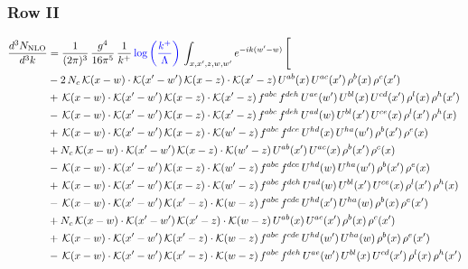 \documentclass[9pt]{article}
\numberwithin{equation}{section}
\begin{document}
\subsubsection{Row II}
\begin{align}
\frac{d^{3}N_{\mathrm{NLO}}}{d^{3}k} & = \frac{1}{(2\pi)^{3}}\,\frac{g^{4}}{16\pi^{5}}\,\frac{1}{k^{+}}\,{\color{blue}\log{\left(\frac{k^{+}}{\Lambda}\right)}}\,\int_{x,x',z,w,w'}e^{-ik(w'-w)}\,\Bigg[\notag\\ &  -2\,N_{c}\,\mathcal{K}(x-w)\cdot\mathcal{K}(x'-w')\,\mathcal{K}(x-z)\cdot\mathcal{K}(x'-z)\,U^{ab}(x)\,U^{ac}(x')\,\rho^{b}(x)\,\rho^{c}(x')\notag\\
& +\,\mathcal{K}(x-w)\cdot\mathcal{K}(x'-w')\,\mathcal{K}(x-z)\cdot\mathcal{K}(x'-z)\,f^{abc}\,f^{deh}\,U^{ae}(w')\,U^{bl}(x)\,U^{cd}(x')\,\rho^{l}(x)\,\rho^{h}(x')\notag\\
& -\,\mathcal{K}(x-w)\cdot\mathcal{K}(x'-w')\,\mathcal{K}(x-z)\cdot\mathcal{K}(x'-z)\,f^{abc}\,f^{deh}\,U^{ad}(w)\,U^{bl}(x')\,U^{ce}(x)\,\rho^{l}(x')\,\rho^{h}(x)\notag\\
& +\,\mathcal{K}(x-w)\cdot\mathcal{K}(x'-w')\,\mathcal{K}(x-z)\cdot\mathcal{K}(w'-z)\,f^{abc}\,f^{dce}\,U^{hd}(x)\,U^{ha}(w')\,\rho^{b}(x')\,\rho^{e}(x)\notag\\
& +N_{c}\,\mathcal{K}(x-w)\cdot\mathcal{K}(x'-w')\,\mathcal{K}(x-z)\cdot\mathcal{K}(w'-z)\,U^{ab}(x')\,U^{ac}(x)\,\rho^{b}(x')\,\rho^{c}(x)\notag\\
& -\,\mathcal{K}(x-w)\cdot\mathcal{K}(x'-w')\,\mathcal{K}(x-z)\cdot\mathcal{K}(w'-z)\,f^{abc}\,f^{dce}\,U^{hd}(w)\,U^{ha}(w')\,\rho^{b}(x')\,\rho^{e}(x)\notag\\
& +\,\mathcal{K}(x-w)\cdot\mathcal{K}(x'-w')\,\mathcal{K}(x-z)\cdot\mathcal{K}(w'-z)\,f^{abc}\,f^{deh}\,U^{ad}(w)\,U^{bl}(x')\,U^{ce}(x)\,\rho^{l}(x')\,\rho^{h}(x)\notag\\
& -\,\mathcal{K}(x-w)\cdot\mathcal{K}(x'-w')\,\mathcal{K}(x'-z)\cdot\mathcal{K}(w-z)\,f^{abc}\,f^{cde}\,U^{hd}(x')\,U^{ha}(w)\,\rho^{b}(x)\,\rho^{e}(x')\notag\\
& +N_{c}\,\mathcal{K}(x-w)\cdot\mathcal{K}(x'-w')\,\mathcal{K}(x'-z)\cdot\mathcal{K}(w-z)\,U^{ab}(x)\,U^{ac}(x')\,\rho^{b}(x)\,\rho^{c}(x')\notag\\
& +\,\mathcal{K}(x-w)\cdot\mathcal{K}(x'-w')\,\mathcal{K}(x'-z)\cdot\mathcal{K}(w-z)\,f^{abc}\,f^{cde}\,U^{hd}(w')\,U^{ha}(w)\,\rho^{b}(x)\,\rho^{e}(x')\notag\\
& -\,\mathcal{K}(x-w)\cdot\mathcal{K}(x'-w')\,\mathcal{K}(x'-z)\cdot\mathcal{K}(w-z)\,f^{abc}\,f^{deh}\,U^{ae}(w')\,U^{bl}(x)\,U^{cd}(x')\,\rho^{l}(x)\,\rho^{h}(x')\notag\\

\end{align}
\end{document}
